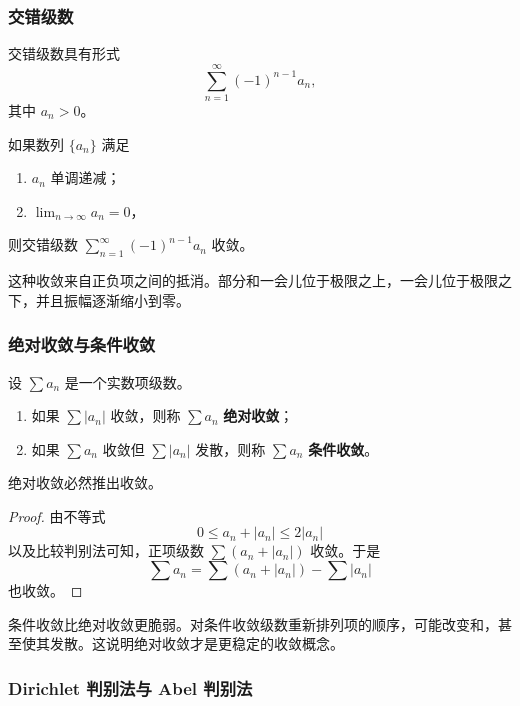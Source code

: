 \subsubsection{交错级数}

交错级数具有形式
\[
    \sum_{n=1}^{\infty}(-1)^{n-1}a_n,
\]
其中 $a_n>0$。

\begin{theorem}
如果数列 $\{a_n\}$ 满足
\begin{enumerate}
    \item $a_n$ 单调递减；
    \item $\lim_{n\to\infty}a_n=0$，
\end{enumerate}
则交错级数 $\sum_{n=1}^{\infty}(-1)^{n-1}a_n$ 收敛。
\end{theorem}

这种收敛来自正负项之间的抵消。部分和一会儿位于极限之上，一会儿位于极限之下，并且振幅逐渐缩小到零。

\subsubsection{绝对收敛与条件收敛}

\begin{definition}[绝对收敛与条件收敛]
设 $\sum a_n$ 是一个实数项级数。
\begin{enumerate}
    \item 如果 $\sum |a_n|$ 收敛，则称 $\sum a_n$ \textbf{绝对收敛}；
    \item 如果 $\sum a_n$ 收敛但 $\sum |a_n|$ 发散，则称 $\sum a_n$ \textbf{条件收敛}。
\end{enumerate}
\end{definition}

\begin{theorem}
绝对收敛必然推出收敛。
\end{theorem}

\begin{proof}
由不等式
\[
    0\leq a_n+|a_n|\leq 2|a_n|
\]
以及比较判别法可知，正项级数 $\sum(a_n+|a_n|)$ 收敛。于是
\[
    \sum a_n=\sum(a_n+|a_n|)-\sum|a_n|
\]
也收敛。
\end{proof}

条件收敛比绝对收敛更脆弱。对条件收敛级数重新排列项的顺序，可能改变和，甚至使其发散。这说明绝对收敛才是更稳定的收敛概念。

\subsubsection{Dirichlet 判别法与 Abel 判别法}

